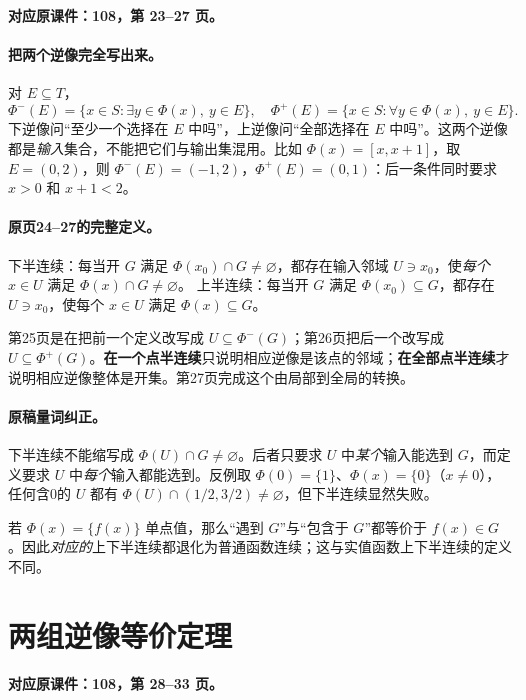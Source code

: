 \textbf{对应原课件：108，第 23--27 页。}


\paragraph{把两个逆像完全写出来。}
对 $E\subseteq T$，
\[\Phi^-(E)=\{x\in S:\exists y\in\Phi(x),\ y\in E\},\quad
\Phi^+(E)=\{x\in S:\forall y\in\Phi(x),\ y\in E\}.\]
下逆像问“至少一个选择在 $E$ 中吗”，上逆像问“全部选择在 $E$ 中吗”。这两个逆像都是\emph{输入}集合，不能把它们与输出集混用。比如 $\Phi(x)=[x,x+1]$，取 $E=(0,2)$，则 $\Phi^-(E)=(-1,2)$，$\Phi^+(E)=(0,1)$：后一条件同时要求 $x>0$ 和 $x+1<2$。
\paragraph{原页24--27的完整定义。}
下半连续：每当开 $G$ 满足 $\Phi(x_0)\cap G\ne\varnothing$，都存在输入邻域 $U\ni x_0$，使\emph{每个} $x\in U$ 满足 $\Phi(x)\cap G\ne\varnothing$。
上半连续：每当开 $G$ 满足 $\Phi(x_0)\subseteq G$，都存在 $U\ni x_0$，使每个 $x\in U$ 满足 $\Phi(x)\subseteq G$。

第25页是在把前一个定义改写成 $U\subseteq\Phi^-(G)$；第26页把后一个改写成 $U\subseteq\Phi^+(G)$。\textbf{在一个点半连续}只说明相应逆像是该点的邻域；\textbf{在全部点半连续}才说明相应逆像整体是开集。第27页完成这个由局部到全局的转换。

\paragraph{原稿量词纠正。}
下半连续不能缩写成 $\Phi(U)\cap G\ne\varnothing$。后者只要求 $U$ 中\emph{某个}输入能选到 $G$，而定义要求 $U$ 中\emph{每个}输入都能选到。反例取 $\Phi(0)=\{1\}$、$\Phi(x)=\{0\}$（$x\ne0$），任何含0的 $U$ 都有 $\Phi(U)\cap(1/2,3/2)\ne\varnothing$，但下半连续显然失败。

若 $\Phi(x)=\{f(x)\}$ 单点值，那么“遇到 $G$”与“包含于 $G$”都等价于 $f(x)\in G$。因此\emph{对应的}上下半连续都退化为普通函数连续；这与实值函数上下半连续的定义不同。


\clearpage\section{两组逆像等价定理}\label{g:108:28}

\textbf{对应原课件：108，第 28--33 页。}


